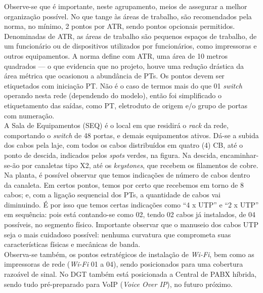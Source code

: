 \documentclass[	DIV=calc,%
							paper=a4,%
							fontsize=12pt,%
							onecolumn]{scrartcl}	 					%
\begin{document}
Observe-se que é importante, neste agrupamento, meios de assegurar a melhor organização possível. No que tange às áreas de trabalho, são recomendados pela norma, no mínimo, 2 pontos por ATR, sendo pontos opcionais permitidos. Denominadas de ATR, as áreas de trabalho são pequenos espaços de trabalho, de um funcionário ou de dispositivos utilizados por funcionários, como impressoras e outros equipamentos. A norma define com ATR, uma área de 10 metros quadrados --- o que evidencia que no projeto, houve uma redução drástica da área métrica que ocasionou a abundância de PTs. Os pontos devem ser etiquetados com iniciação PT. Não é o caso de termos mais do que 01 \textit{switch} operando nesta rede (dependendo do modelo), então foi simplificado o etiquetamento das saídas, como PT, eletroduto de origem e/o grupo de portas com numeração.
\\

A Sala de Equipamentos (SEQ) é o local em que residirá o \textit{rack} da rede, comportando o \textit{switch} de 48 portas, e demais equipamentos ativos. Dá-se a subida dos cabos pela laje, com todos os cabos distribuídos em quatro (4) CB, até o ponto de descida, indicados pelos \textit{spots} verdes, na figura. Na descida, encaminhar-se-ão por canaletas tipo X2, até os \textit{keystones}, que recebem os filamentos de cobre. 
\\

Na planta, é possível observar que temos indicações de número de cabos dentro da canaleta. Em certos pontos, temos por certo que recebemos em torno de 8 cabos; e, com a ligação sequencial dos PTs, a quantidade de cabos vai diminuindo. É por isso que temos certas indicações como ``4 x UTP'' e ``2 x UTP'' em sequência: pois está contando-se como 02, tendo 02 cabos já instalados, de 04 possíveis, no segmento físico. Importante observar que o manuseio dos cabos UTP seja o mais cuidadoso possível: nenhuma curvatura que comprometa suas características físicas e mecânicas de banda.
\\

Observa-se também, os pontos estratégicos de instalação de \textit{Wi-Fi}, bem como as impressoras de rede (\textit{Wi-Fi} 01 a 04), sendo posicionados para uma cobertura razoável de sinal. No DGT também está posicionada a Central de PABX híbrida, sendo tudo pré-preparado para VoIP (\textit{Voice Over IP}), no futuro próximo.




\clearpage
\thispagestyle{plain}
\end{document}
